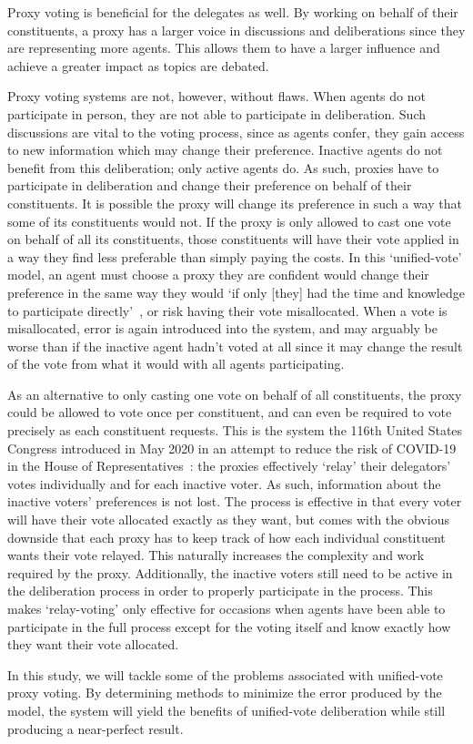 Proxy voting is beneficial for the delegates as well.
By working on behalf of their constituents, a proxy has a larger voice in discussions
and deliberations since they are representing more agents.
This allows them to have a larger influence and achieve a greater impact as topics
are debated.

Proxy voting systems are not, however, without flaws.
When agents do not participate in person, they are not able to participate in
deliberation.
Such discussions are vital to the voting process, since as agents confer, they gain
access to new information which may change their preference.
Inactive agents do not benefit from this deliberation; only active agents do.
As such, proxies have to participate in deliberation and change their preference on
behalf of their constituents.
It is possible the proxy will change its preference in such a way that some of its
constituents would not.
If the proxy is only allowed to cast one vote    on behalf of all its constituents, those
constituents will have their vote applied in a way they find less preferable than
simply paying the costs.
In this `unified-vote' model, an agent must choose a proxy they are confident would
change their preference in the same way they would `if only [they] had the time and
knowledge to participate directly'~\cite{Miller1969}, or risk having their vote
misallocated.
When a vote is misallocated, error is again introduced into the system, and may
arguably be worse than if the inactive agent hadn't voted at all since it may change
the result of the vote from what it would with all agents participating.

As an alternative to only casting one vote on behalf of all constituents, the proxy
could be allowed to vote once per constituent, and can even be required to vote
precisely as each constituent requests.
This is the system the 116th United States Congress introduced in May 2020 in an
attempt to reduce the risk of COVID-19 in the House of
Representatives~\cite{CERP2020, Congress.gov2020}: the proxies effectively `relay' their
delegators' votes individually and for each inactive voter.
As such, information about the inactive voters' preferences is not lost.
The process is effective in that every voter will have their vote allocated exactly
as they want, but comes with the obvious downside   that each proxy has to keep track
of how each individual constituent wants their vote relayed.
This naturally increases the complexity and work required by the proxy.
Additionally, the inactive voters still need to be active in the deliberation process
in order to properly participate in the process.
This makes `relay-voting' only effective for occasions when agents have been able to
participate in the full process except for the voting itself and know exactly how
they want their vote allocated.

In this study, we will tackle some of the problems associated with unified-vote proxy
voting.
By determining methods to minimize the error produced by the model, the system will
yield the benefits of unified-vote deliberation while still producing a near-perfect
result.
